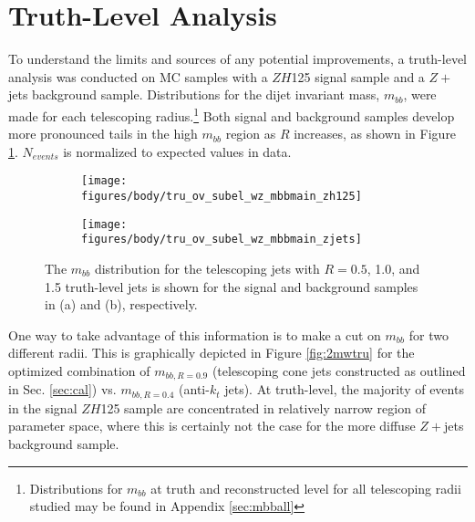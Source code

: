 \section{Truth-Level Analysis}
\label{sec:tru}
To understand the limits and sources of any potential improvements, a truth-level analysis was conducted on MC samples with a $ZH$125 signal sample and a $Z+$jets background sample. Distributions for the dijet invariant mass, $m_{bb}$, were made for each telescoping radius.\footnote{Distributions for $m_{bb}$ at truth and reconstructed level for all telescoping radii studied may be found in Appendix \ref{sec:mbball}}  Both signal and background samples develop more pronounced tails in the high $m_{bb}$ region as $R$ increases, as shown in Figure \ref{fig:multradtru}.  $N_{events}$ is normalized to expected values in data.

\begin{figure}[!htbp]\captionsetup{justification=centering}
\begin{center}
\begin{subfigure}[t]{18pc}\centering\texttt{[image: figures/body/tru\_ov\_subel\_wz\_mbbmain\_zh125]}\caption{}\end{subfigure}
\begin{subfigure}[t]{18pc}\centering\texttt{[image: figures/body/tru\_ov\_subel\_wz\_mbbmain\_zjets]}\caption{}\end{subfigure}
\caption{\label{fig:multradtru}The $m_{bb}$ distribution for the telescoping jets with $R=0.5$, 1.0, and 1.5 truth-level jets is shown for the signal and background samples in (a) and (b), respectively.}
\end{center}
\end{figure}

One way to take advantage of this information is to make a cut on $m_{bb}$ for two different radii.  This is graphically depicted in Figure \ref{fig:2mwtru} for the optimized combination of $m_{bb,R=0.9}$ (telescoping cone jets constructed as outlined in Sec. \ref{sec:cal}) vs. $m_{bb,R=0.4}$ (anti-$k_t$ jets).  At truth-level, the majority of events in the signal $ZH$125 sample are concentrated in relatively narrow region of parameter space, where this is certainly not the case for the more diffuse $Z+$jets background sample.

